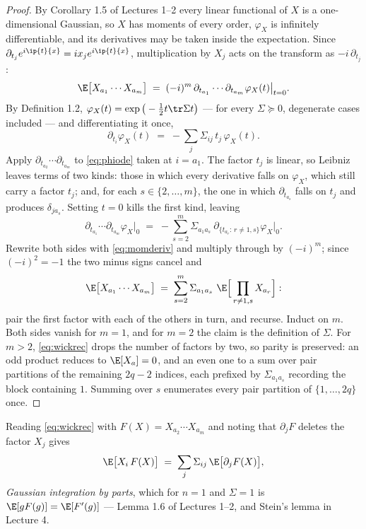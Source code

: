 \documentclass[11pt]{article}
\begin{document}
\begin{proof}
By Corollary 1.5 of Lectures 1--2 every linear functional of $X$ is a one-dimensional Gaussian, so $X$ has moments of every order, $\varphi_X$ is infinitely differentiable, and its derivatives may be taken inside the expectation. Since $\partial_{t_j}e^{i\ip{t}{x}}=ix_je^{i\ip{t}{x}}$, multiplication by $X_j$ acts on the transform as $-i\,\partial_{t_j}$:
\begin{equation}\label{eq:momderiv}
\E\big[X_{a_1}\cdots X_{a_m}\big]\;=\;(-i)^m\,\partial_{t_{a_1}}\cdots\partial_{t_{a_m}}\varphi_X(t)\big|_{t=0}.
\end{equation}
By Definition 1.2, $\varphi_X(t)=\exp\big(-\tfrac12t\tr\Sigma t\big)$ --- for every $\Sigma\succeq0$, degenerate cases included --- and differentiating it once,
\begin{equation}\label{eq:phiode}
\partial_{t_i}\varphi_X(t)\;=\;-\sum_j\Sigma_{ij}\,t_j\,\varphi_X(t).
\end{equation}
Apply $\partial_{t_{a_2}}\cdots\partial_{t_{a_m}}$ to \eqref{eq:phiode} taken at $i=a_1$. The factor $t_j$ is linear, so Leibniz leaves terms of two kinds: those in which every derivative falls on $\varphi_X$, which still carry a factor $t_j$; and, for each $s\in\{2,\dots,m\}$, the one in which $\partial_{t_{a_s}}$ falls on $t_j$ and produces $\delta_{ja_s}$. Setting $t=0$ kills the first kind, leaving
\[
\partial_{t_{a_1}}\cdots\partial_{t_{a_m}}\varphi_X\big|_{0}\;=\;-\sum_{s=2}^{m}\Sigma_{a_1a_s}\ \partial_{\{t_{a_r}:\,r\ne1,s\}}\varphi_X\big|_{0}.
\]
Rewrite both sides with \eqref{eq:momderiv} and multiply through by $(-i)^m$; since $(-i)^2=-1$ the two minus signs cancel and
\begin{equation}\label{eq:wickrec}
\E\big[X_{a_1}\cdots X_{a_m}\big]\;=\;\sum_{s=2}^{m}\Sigma_{a_1a_s}\ \E\Big[\prod_{r\ne1,s}X_{a_r}\Big] :
\end{equation}
pair the first factor with each of the others in turn, and recurse. Induct on $m$. Both sides vanish for $m=1$, and for $m=2$ the claim is the definition of $\Sigma$. For $m>2$, \eqref{eq:wickrec} drops the number of factors by two, so parity is preserved: an odd product reduces to $\E[X_a]=0$, and an even one to a sum over pair partitions of the remaining $2q-2$ indices, each prefixed by $\Sigma_{a_1a_s}$ recording the block containing $1$. Summing over $s$ enumerates every pair partition of $\{1,\dots,2q\}$ once.
\end{proof}

\begin{remark}
Reading \eqref{eq:wickrec} with $F(X)=X_{a_2}\cdots X_{a_m}$ and noting that $\partial_jF$ deletes the factor $X_j$ gives
\[
\E\big[X_i\,F(X)\big]\;=\;\sum_j\Sigma_{ij}\,\E\big[\partial_jF(X)\big],
\]
\emph{Gaussian integration by parts}, which for $n=1$ and $\Sigma=1$ is $\E[gF(g)]=\E[F'(g)]$ --- Lemma 1.6 of Lectures 1--2, and Stein's lemma in Lecture 4.
\end{remark}
\end{document}
